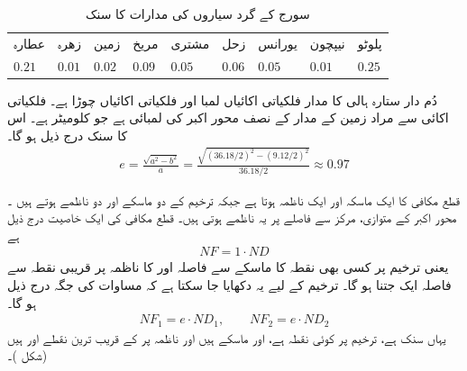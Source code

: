 \begin{table}
\caption{سورج کے گرد سیاروں کی مدارات  کا سنک}
\label{جدول_مخروط_سنک}
\centering
\begin{tabular}{lllllllll}
\toprule
عطارہ&زھرہ&زمین&مریخ&مشتری&زحل&یورانس&نیپچون&پلوٹو\\
 $0.21$&$0.01$&$0.02$&$0.09$&$0.05$&$0.06$&$0.05$&$0.01$&$0.25$\\
\bottomrule
\end{tabular}
\end{table}

دُم دار ستارہ ہالی کا مدار  فلکیاتی اکائیاں لمبا اور  فلکیاتی اکائیاں چوڑا ہے۔ فلکیاتی اکائی سے مراد زمین کے مدار کے نصف  محور اکبر کی لمبائی ہے جو  کلومیٹر ہے۔ اس کا سنک درج ذیل ہو گا۔
\begin{align*}
e=\frac{\sqrt{a^2-b^2}}{a}=\frac{\sqrt{(36.18/2)^2-(9.12/2)^2}}{36.18/2}\approx 0.97
\end{align*}

قطع مکافی کا ایک ماسکہ اور ایک ناظمہ ہوتا  ہے جبکہ ترخیم کے دو ماسکے اور دو ناظمے  ہوتے ہیں ۔  محور اکبر کے متوازی، مرکز سے  فاصلے پر یہ ناظمے   ہوتی  ہیں۔ قطع مکافی کی ایک خاصیت درج ذیل ہے
\begin{align}\label{مساوات_مخروط_قطع_مکافی_خاصیت_الف}
NF=1\cdot ND
\end{align}
یعنی ترخیم پر کسی بھی نقطہ  کا ماسکے  سے فاصلہ  اور  کا ناظمہ پر قریبی نقطہ  سے  فاصلہ ایک جتنا ہو گا۔  ترخیم کے لیے یہ دکھایا جا سکتا ہے کہ  مساوات  کی جگہ درج ذیل ہو گا۔
\begin{align}\label{مساوات_مخروط_ترخیم_خاصیت_الف}
NF_1=e\cdot ND_1,\quad \quad NF_2=e\cdot ND_2
\end{align}
یہاں  سنک ہے،  ترخیم پر کوئی نقطہ ہے،  اور  ماسکے ہیں اور ناظمہ پر  کے قریب ترین نقطے    اور   ہیں (شکل )۔

